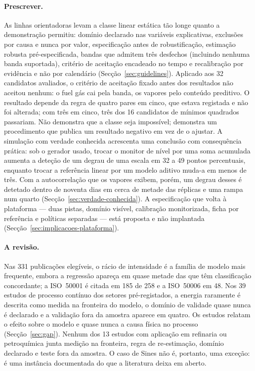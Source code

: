 \paragraph{Prescrever.} As linhas orientadoras levam a classe linear
estática tão longe quanto a demonstração permitiu: domínio declarado nas variáveis explicativas,
exclusões por causa e nunca por valor, especificação antes de robustificação,
estimação robusta pré-especificada, bandas que admitem três desfechos
(incluindo nenhuma banda suportada), critério de aceitação encadeado no
tempo e recalibração por evidência e não por calendário
(Secção~\ref{sec:guidelines}). Aplicado aos 32 candidatos avaliados, o
critério de aceitação fixado antes dos resultados não aceitou nenhum: o fuel
gás cai pela banda, os vapores pelo conteúdo preditivo. O resultado depende
da regra de quatro pares em cinco, que estava registada e não foi alterada;
com três em cinco, três dos 16 candidatos de mínimos quadrados passariam.
Não demonstra que a classe seja impossível; demonstra um procedimento que
publica um resultado negativo em vez de o ajustar. A simulação com verdade
conhecida acrescenta uma conclusão com consequência prática: sob o gerador
usado, trocar o monitor de nível por uma soma acumulada aumenta a deteção de
um degrau de uma escala em 32 a 49 pontos percentuais, enquanto trocar a
referência linear por um modelo aditivo muda-a em menos de três. Com a
autocorrelação que os vapores exibem, porém, um degrau desses é detetado
dentro de noventa dias em cerca de metade das réplicas e uma rampa num
quarto (Secção~\ref{sec:verdade-conhecida}). A especificação que volta à
plataforma --- duas pistas, domínio visível, calibração monitorizada, ficha
por referência e políticas separadas --- está proposta e não implantada
(Secção~\ref{sec:implicacoes-plataforma}).

\paragraph{A revisão.} Nas 331 publicações elegíveis, o rácio de
intensidade é a família de modelo mais frequente, embora a regressão apareça
em quase metade das que têm classificação concordante; a ISO~50001 é citada
em 185 de 258 e a ISO~50006 em 48. Nos 39 estudos de processo contínuo dos
setores pré-registados, a energia raramente é descrita como medida na
fronteira do modelo, o domínio de validade quase nunca é declarado e a
validação fora da amostra aparece em quatro. Os estudos relatam o efeito
sobre o modelo e quase nunca a causa física no processo
(Secção~\ref{sec:gap}). Nenhum dos 13 estudos com aplicação em refinaria ou
petroquímica junta medição na fronteira, regra de re-estimação, domínio
declarado e teste fora da amostra. O caso de Sines não é, portanto, uma
exceção: é uma instância documentada do que a literatura deixa em aberto.

